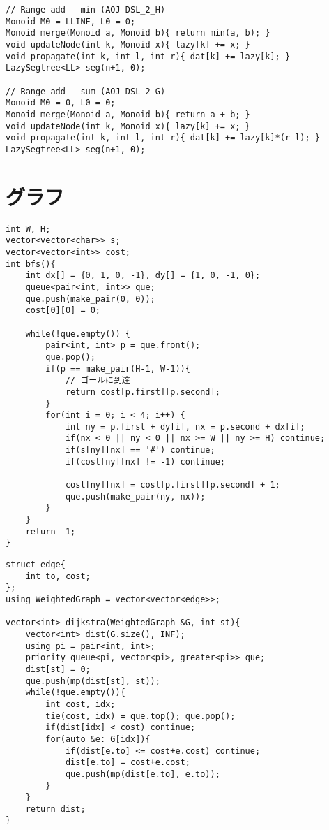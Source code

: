 \documentclass[11pt,a4paper]{jsarticle}
\newcommand{\minititle}[1]{\medskip{\large \sf #1}\medskip}
\begin{document}
\begin{lstlisting}
// Range add - min (AOJ DSL_2_H)
Monoid M0 = LLINF, L0 = 0;
Monoid merge(Monoid a, Monoid b){ return min(a, b); }
void updateNode(int k, Monoid x){ lazy[k] += x; }
void propagate(int k, int l, int r){ dat[k] += lazy[k]; }
LazySegtree<LL> seg(n+1, 0);

// Range add - sum (AOJ DSL_2_G)
Monoid M0 = 0, L0 = 0;
Monoid merge(Monoid a, Monoid b){ return a + b; }
void updateNode(int k, Monoid x){ lazy[k] += x; }
void propagate(int k, int l, int r){ dat[k] += lazy[k]*(r-l); }
LazySegtree<LL> seg(n+1, 0);
\end{lstlisting}

\newpage
\section{グラフ}
\minititle{Grid上でのBFS}
\begin{lstlisting}
int W, H;
vector<vector<char>> s;
vector<vector<int>> cost;
int bfs(){
    int dx[] = {0, 1, 0, -1}, dy[] = {1, 0, -1, 0};
    queue<pair<int, int>> que;
    que.push(make_pair(0, 0));
    cost[0][0] = 0;

    while(!que.empty()) {
        pair<int, int> p = que.front();
        que.pop();
        if(p == make_pair(H-1, W-1)){
            // ゴールに到達
            return cost[p.first][p.second];
        }
        for(int i = 0; i < 4; i++) {
            int ny = p.first + dy[i], nx = p.second + dx[i];
            if(nx < 0 || ny < 0 || nx >= W || ny >= H) continue;
            if(s[ny][nx] == '#') continue;
            if(cost[ny][nx] != -1) continue;

            cost[ny][nx] = cost[p.first][p.second] + 1;
            que.push(make_pair(ny, nx));
        }
    }
    return -1;
}
\end{lstlisting}

\minititle{Dijkstra法(単一始点最短経路)}
\begin{lstlisting}
struct edge{
    int to, cost;
};
using WeightedGraph = vector<vector<edge>>;

vector<int> dijkstra(WeightedGraph &G, int st){
    vector<int> dist(G.size(), INF);
    using pi = pair<int, int>;
    priority_queue<pi, vector<pi>, greater<pi>> que;
    dist[st] = 0;
    que.push(mp(dist[st], st));
    while(!que.empty()){
        int cost, idx;
        tie(cost, idx) = que.top(); que.pop();
        if(dist[idx] < cost) continue;
        for(auto &e: G[idx]){
            if(dist[e.to] <= cost+e.cost) continue;
            dist[e.to] = cost+e.cost;
            que.push(mp(dist[e.to], e.to));
        }
    }
    return dist;
}
\end{lstlisting}
\end{document}
